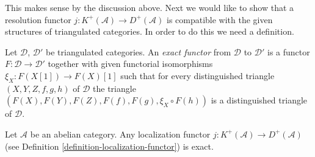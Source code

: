 \noindent
This makes sense by the discussion above.
Next we would like to show that a resolution
functor $j : K^{+}(\mathcal{A}) \to D^{+}(\mathcal{A})$
is compatible with the given structures of triangulated
categories. In order to do this we need a definition.

\begin{definition}
\label{definition-exact-functor-triangulated-categories}
Let $\mathcal{D}$, $\mathcal{D}'$ be triangulated
categories. An {\it exact functor} from $\mathcal{D}$ to $\mathcal{D}'$
is a functor $F : \mathcal{D} \to \mathcal{D}'$ together
with given functorial isomorphisms $\xi_X : F(X[1]) \to F(X)[1]$
such that for every distinguished triangle
$(X, Y, Z, f, g, h)$ of $\mathcal{D}$ the triangle
$(F(X), F(Y), F(Z), F(f), F(g), \xi_X \circ F(h))$
is a distinguished triangle of $\mathcal{D}$.
\end{definition}

\begin{lemma}
\label{lemma-j-is-exact}
Let $\mathcal{A}$ be an abelian category.
Any localization functor
$j : K^{+}(\mathcal{A}) \to D^{+}(\mathcal{A})$
(see Definition \ref{definition-localization-functor})
is exact.
\end{lemma}

